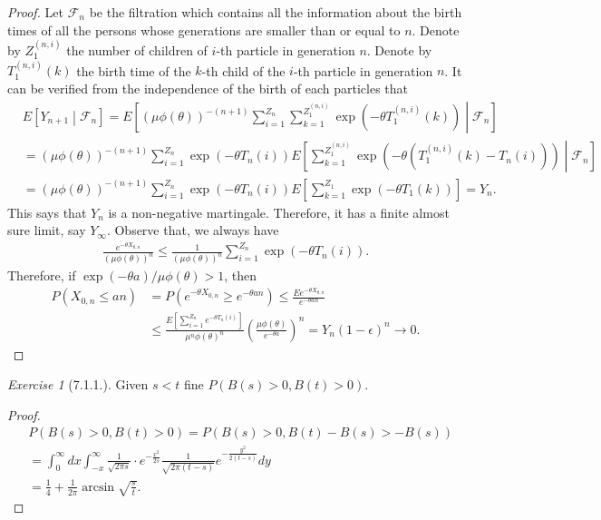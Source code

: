 \documentclass[12pt,a4paper]{amsart}
\theoremstyle{plain}
\theoremstyle{definition}
\theoremstyle{remark}
\newtheorem*{exe}{Exercise}
\numberwithin{equation}{section}
\begin{document}
\begin{proof}
Let $\mathcal F_n$ be the filtration which contains all the information about the birth times of all the persons whose generations are smaller than or equal to $n$.
Denote by $Z_1^{(n,i)}$ the number of children of $i$-th particle in generation $n$. 
Denote by $T_1^{(n,i)}(k)$ the birth time of the $k$-th child of the $i$-th particle in generation $n$.
It can be verified from the independence of the birth of each particles that
\begin{align}
  &E\left[ Y_{n+1}\middle|  \mathcal F_n  \right]
  = E \left[\left(\mu \phi(\theta)\right)^{-(n+1)} \sum_{i=1}^{Z_n} \sum_{k=1}^{Z_1^{(n,i)}} \exp(-\theta T_1^{(n,i)}(k)) \middle| \mathcal F_n \right]
  \\&= \left(\mu \phi(\theta)\right)^{-(n+1)} \sum_{i=1}^{Z_n} \exp(-\theta T_n(i)) E \left[ \sum_{k=1}^{Z_1^{(n,i)}} \exp\left(-\theta\left( T_1^{(n,i)}(k) - T_n(i)\right)\right) \middle| \mathcal F_n \right]
  \\&= \left(\mu \phi(\theta)\right)^{-(n+1)} \sum_{i=1}^{Z_n} \exp(-\theta T_n(i)) E \left[ \sum_{k=1}^{Z_1} \exp\left(-\theta T_1(k)\right) \right]
= Y_n.
\end{align}
This says that $Y_n$ is a non-negative martingale.
Therefore, it has a finite almost sure limit, say $Y_\infty$.
Observe that, we always have
\begin{align}
  \frac{e^{-\theta X_{0,n}}}{\left( \mu \phi(\theta) \right)^n} \leq \frac{1}{\left( \mu \phi(\theta) \right)^n} \sum_{i=1}^{Z_n} \exp\left( -\theta T_n(i) \right).
\end{align}
Therefore, if $\exp(-\theta a)/\mu \phi(\theta) > 1$, then
\begin{align}
P(X_{0,n} \leq an)
&= P(e^{-\theta X_{0,n}} \geq e^{-\theta a n}) 
\leq \frac{E e^{-\theta X_{0,n}}}{e^{-\theta a n}}
\\&\leq \frac{E[ \sum_{i=1}^{Z_n} e^{-\theta T_{n}(i)}]}{\mu^n \phi(\theta)^n} \left(\frac{\mu \phi(\theta)}{e^{-\theta a}}\right)^n
= Y_n (1-\epsilon)^n \to 0.
\end{align}
\end{proof}
\begin{exe}[7.1.1.]
  Given $s< t$ fine $P\left( B(s)>0, B(t)>0 \right)$.
\end{exe}
\begin{proof}
  \begin{align}
&P(B(s)>0, B(t) >0) 
= P(B(s)>0, B(t)- B(s) > - B (s)) 
   \\&= \int_0^\infty dx   \int_{-x}^\infty \frac{1}{\sqrt{2\pi s}}\cdot e^{- \frac{x^2}{2s}}\frac{1}{\sqrt{2\pi (t-s)}} e^{-\frac{y^2}{ 2(t-s)}} dy
\\& = \frac{1}{4} +\frac{1}{2\pi} \arcsin \sqrt{\frac{s}{t}}.
  \end{align}
\end{proof}
\end{document}
